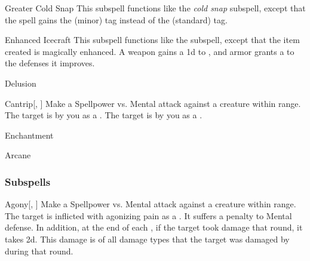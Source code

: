 \begin{ability}[\nth{5}]{Greater Cold Snap}
This subspell functions like the \textit{cold snap} subspell, except that the spell gains the  (minor) tag instead of the  (standard) tag.
\end{ability}
\vspace{0.25em}


\begin{ability}[\nth{6}]{Enhanced Icecraft}
This subspell functions like the  subspell, except that the item created is magically enhanced.
A weapon gains a \plus1d  to , and armor grants a   to the defenses it improves.
\end{ability}
\vspace{0.25em}

\newpage
\begin{spellsection}{Delusion}

\begin{spellheader}
\end{spellheader}


\begin{ability}{Cantrip}[, ]
Make a Spellpower vs. Mental attack against a creature within \rngmed range.
\hit The target is  by you as a .
\crit The target is  by you as a .
\end{ability}




 Enchantment

 Arcane
\end{spellsection}


\subsubsection{Subspells}


\begin{ability}[\nth{1}]{Agony}[, ]
Make a Spellpower vs. Mental attack against a creature within \rngmed range.
\hit The target is inflicted with agonizing pain as a .
It suffers a  penalty to Mental defense.
In addition, at the end of each , if the target took damage that round, it takes  \minus2d.
This damage is of all damage types that the target was damaged by during that round.
\end{ability}
\vspace{0.25em}


